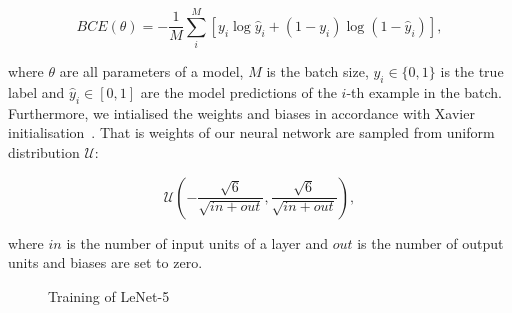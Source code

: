 \begin{equation}
	\mathit{BCE}(\theta) = -\frac{1}{M} \sum_i^M [y_i \log \hat{y}_i + (1 - y_i) \log(1 - \hat{y}_i)],
\end{equation}

where \(\theta\) are all parameters of a model,
\(M\) is the batch size,
\(y_i \in \{0, 1\}\) is the true label
and \(\hat{y}_i \in [0, 1]\) are the model predictions of the \(i\)-th example in the batch.
Furthermore, we intialised the weights and biases in accordance with Xavier initialisation~\cite{glorot2010}.
That is weights of our neural network are sampled from uniform distribution \(\mathcal{U}\):

\begin{equation}
	\mathcal{U}\left(
	-\frac{\sqrt{6}}{\sqrt{\mathit{in} + \mathit{out}}},
	\frac{\sqrt{6}}{\sqrt{\mathit{in} + \mathit{out}}}
	\right),
\end{equation}

where \(\mathit{in}\) is the number of input units of a layer
and \(\mathit{out}\) is the number of output units
and biases are set to zero.


\begin{figure}
	\caption{Training of LeNet-5}
	\label{lenet_losses}
\end{figure}

